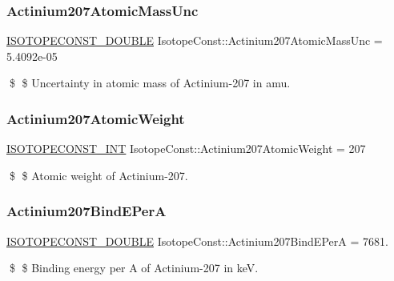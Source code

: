 \subsubsection{\texorpdfstring{Actinium207\+Atomic\+Mass\+Unc}{Actinium207AtomicMassUnc}}
{\footnotesize\ttfamily \mbox{\hyperlink{group___isotope_const-_macros_ga8f45a7272ce02c0b4c65c44636ed719a}{I\+S\+O\+T\+O\+P\+E\+C\+O\+N\+S\+T\+\_\+\+D\+O\+U\+B\+LE}} Isotope\+Const\+::\+Actinium207\+Atomic\+Mass\+Unc = 5.\+4092e-\/05}

\$ \$ Uncertainty in atomic mass of Actinium-\/207 in amu. \mbox{\label{group___isotope_const-_actinium-_ac207_ga3133625b943553e919dff45b9c447dc3}} 
\subsubsection{\texorpdfstring{Actinium207\+Atomic\+Weight}{Actinium207AtomicWeight}}
{\footnotesize\ttfamily \mbox{\hyperlink{group___isotope_const-_macros_ga5f18360b3e99483a35c32d789e62621c}{I\+S\+O\+T\+O\+P\+E\+C\+O\+N\+S\+T\+\_\+\+I\+NT}} Isotope\+Const\+::\+Actinium207\+Atomic\+Weight = 207}

\$ \$ Atomic weight of Actinium-\/207. \mbox{\label{group___isotope_const-_actinium-_ac207_gad8eeee8b7ab05e09d317d25e1a5df117}} 
\subsubsection{\texorpdfstring{Actinium207\+Bind\+E\+PerA}{Actinium207BindEPerA}}
{\footnotesize\ttfamily \mbox{\hyperlink{group___isotope_const-_macros_ga8f45a7272ce02c0b4c65c44636ed719a}{I\+S\+O\+T\+O\+P\+E\+C\+O\+N\+S\+T\+\_\+\+D\+O\+U\+B\+LE}} Isotope\+Const\+::\+Actinium207\+Bind\+E\+PerA = 7681.}

\$ \$ Binding energy per A of Actinium-\/207 in keV. \mbox{\label{group___isotope_const-_actinium-_ac207_ga00515e9729da0c2b4f658213f7a13392}} 
